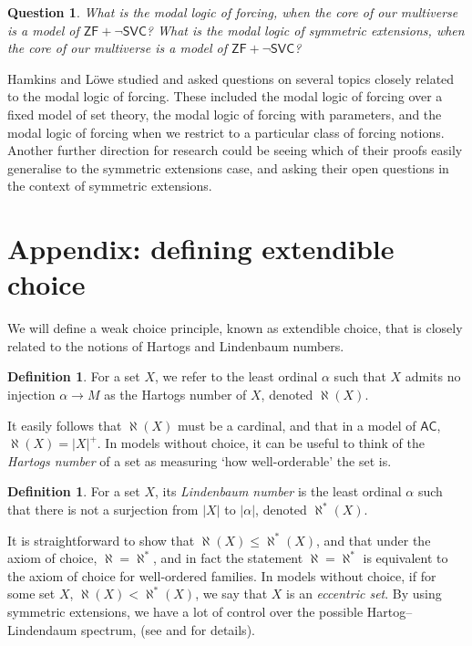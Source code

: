 \documentclass[a4paper,11pt]{amsart}
\newtheorem{question}{Question}
\theoremstyle{definition}
\newtheorem{definition}[theorem]{Definition}
\newcommand{\AC}{\mathsf{AC}}
\newcommand{\ZF}{\mathsf{ZF}}
\newcommand{\SVC}{\mathsf{SVC}}
\begin{document}
\begin{question}\label{notsvc:question}
    What is the modal logic of forcing, when the core of our multiverse is a model of $\ZF + \neg\SVC$? What is the modal logic of symmetric extensions, when the core of our multiverse is a model of $\ZF + \neg\SVC$?
\end{question}

Hamkins and Löwe \cite{Hamkins-modal-logic} studied and asked questions on several topics closely related to the modal logic of forcing. These included the modal logic of forcing over a fixed model of set theory, the modal logic of forcing with parameters, and the modal logic of forcing when we restrict to a particular class of forcing notions. Another further direction for research could be seeing which of their proofs easily generalise to the symmetric extensions case, and asking their open questions in the context of symmetric extensions. 

\section*{Appendix: defining extendible choice}

We will define a weak choice principle, known as extendible choice, that is closely related to the notions of Hartogs and Lindenbaum numbers. 

\begin{definition}
    For a set $X$, we refer to the least ordinal $\alpha$ such that $X$ admits no injection $\alpha \rightarrow M$ as the Hartogs number of $X$, denoted $\aleph(X)$. 
\end{definition}

It easily follows that $\aleph(X)$ must be a cardinal, and that in a model of $\AC$, $\aleph(X) = |X|^+$. In models without choice, it can be useful to think of the \emph{Hartogs number} of a set as measuring `how well-orderable' the set is. 

\begin{definition}
    For a set $X$, its \emph{Lindenbaum number} is the least ordinal $\alpha$ such that there is not a surjection from $|X|$ to $|\alpha|$, denoted $\aleph^*(X)$. 
\end{definition}

It is straightforward to show that $\aleph(X) \leq \aleph^*(X)$, and that under the axiom of choice, $\aleph = \aleph^*$, and in fact the statement $\aleph = \aleph^*$ is equivalent to the axiom of choice for well-ordered families. In models without choice, if for some set $X$, $\aleph(X) < \aleph^*(X)$, we say that $X$ is an \emph{eccentric set}. By using symmetric extensions, we have a lot of control over the possible Hartog--Lindendaum spectrum, (see \cite{karagila-ryan-smith} and \cite{ryan-smith-hartogs} for details).
\end{document}
